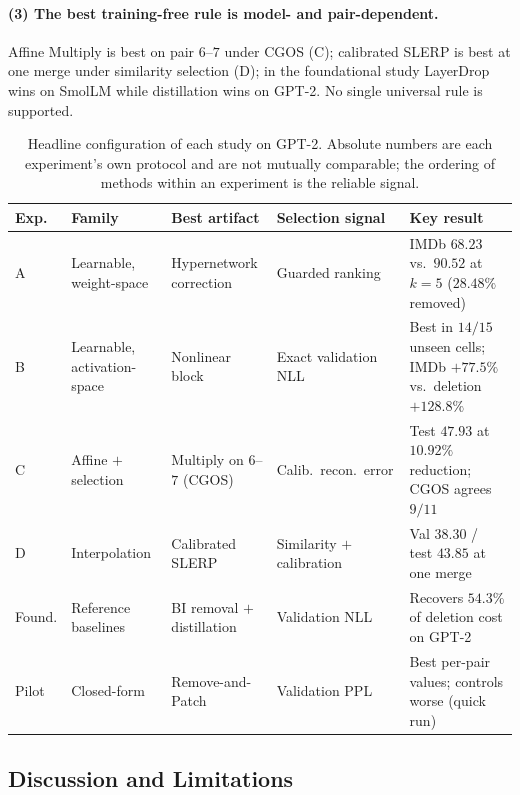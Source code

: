 \documentclass[10pt,a4paper]{article}
\begin{document}
\paragraph{(3) The best training-free rule is model- and pair-dependent.} Affine
Multiply is best on pair $6$--$7$ under CGOS (C); calibrated SLERP is best at one
merge under similarity selection (D); in the foundational study LayerDrop wins on
SmolLM while distillation wins on GPT-2. No single universal rule is supported.

\begin{table}[t]
\centering
\footnotesize
\begin{tabular}{L{1.0cm} L{2.7cm} L{2.7cm} L{2.5cm} L{4.5cm}}
\toprule
Exp. & Family & Best artifact & Selection signal & Key result \\
\midrule
A & Learnable, weight-space & Hypernetwork correction & Guarded ranking
  & IMDb $68.23$ vs.\ $90.52$ at $k{=}5$ ($28.48\%$ removed) \\
B & Learnable, activation-space & Nonlinear block & Exact validation NLL
  & Best in $14/15$ unseen cells; IMDb $+77.5\%$ vs.\ deletion $+128.8\%$ \\
C & Affine $+$ selection & Multiply on $6$--$7$ (CGOS) & Calib.\ recon.\ error
  & Test $47.93$ at $10.92\%$ reduction; CGOS agrees $9/11$ \\
D & Interpolation & Calibrated SLERP & Similarity $+$ calibration
  & Val $38.30$ / test $43.85$ at one merge \\
Found. & Reference baselines & BI removal $+$ distillation & Validation NLL
  & Recovers $54.3\%$ of deletion cost on GPT-2 \\
Pilot & Closed-form & Remove-and-Patch & Validation PPL
  & Best per-pair values; controls worse (quick run) \\
\bottomrule
\end{tabular}
\caption{Headline configuration of each study on GPT-2. Absolute numbers are each
experiment's own protocol and are not mutually comparable; the ordering of
methods within an experiment is the reliable signal.}
\label{tab:merged}
\end{table}

\subsection{Discussion and Limitations}
\label{sec:limits}
\end{document}
